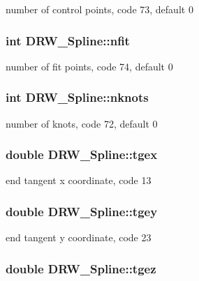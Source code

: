 number of control points, code 73, default 0 \hypertarget{classDRW__Spline_aa9269fcfa581a0e0b25a84fb8dddc96c}{
\subsubsection[{nfit}]{\setlength{\rightskip}{0pt plus 5cm}int D\-R\-W\-\_\-\-Spline\-::nfit}}\label{classDRW__Spline_aa9269fcfa581a0e0b25a84fb8dddc96c}
number of fit points, code 74, default 0 \hypertarget{classDRW__Spline_a5dd173d8176de55d07f00d96dedb0201}{
\subsubsection[{nknots}]{\setlength{\rightskip}{0pt plus 5cm}int D\-R\-W\-\_\-\-Spline\-::nknots}}\label{classDRW__Spline_a5dd173d8176de55d07f00d96dedb0201}
number of knots, code 72, default 0 \hypertarget{classDRW__Spline_ae6195201183d629d458d820417587197}{
\subsubsection[{tgex}]{\setlength{\rightskip}{0pt plus 5cm}double D\-R\-W\-\_\-\-Spline\-::tgex}}\label{classDRW__Spline_ae6195201183d629d458d820417587197}
end tangent x coordinate, code 13 \hypertarget{classDRW__Spline_a5bbb13c6219350335c353b86755adcea}{
\subsubsection[{tgey}]{\setlength{\rightskip}{0pt plus 5cm}double D\-R\-W\-\_\-\-Spline\-::tgey}}\label{classDRW__Spline_a5bbb13c6219350335c353b86755adcea}
end tangent y coordinate, code 23 \hypertarget{classDRW__Spline_acfe280748cc843881dffd17430a2be37}{
\subsubsection[{tgez}]{\setlength{\rightskip}{0pt plus 5cm}double D\-R\-W\-\_\-\-Spline\-::tgez}}\label{classDRW__Spline_acfe280748cc843881dffd17430a2be37}
